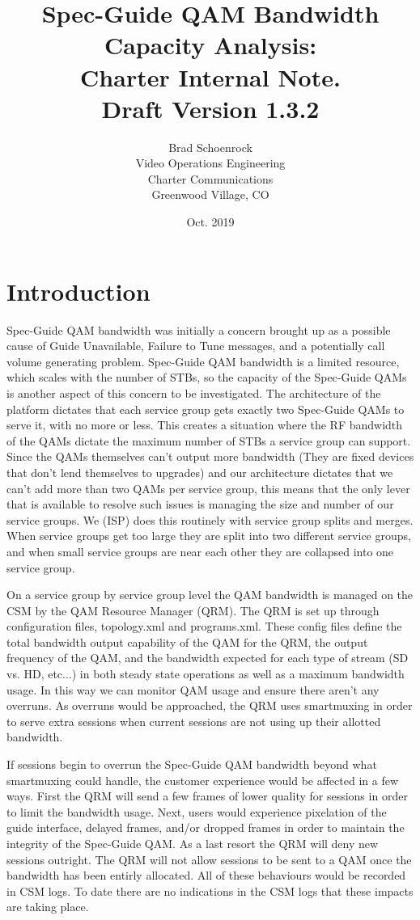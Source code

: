 \documentclass{article}
\author{Brad Schoenrock\\Video Operations Engineering\\Charter Communications\\Greenwood Village, CO}
\title{Spec-Guide QAM Bandwidth Capacity Analysis:\\Charter Internal Note.\\Draft Version 1.3.2}
\date{Oct. 2019}
\begin{document}
\maketitle
\newpage

\tableofcontents
\newpage

\section{Introduction}
\label{SECTION-Introduction}

Spec-Guide QAM bandwidth was initially a concern brought up as a possible cause of Guide Unavailable, Failure to Tune messages, and a potentially call volume generating problem. Spec-Guide QAM bandwidth is a limited resource, which scales with the number of STBs, so the capacity of the Spec-Guide QAMs is another aspect of this concern to be investigated. The architecture of the platform dictates that each service group gets exactly two Spec-Guide QAMs to serve it, with no more or less. This creates a situation where the RF bandwidth of the QAMs dictate the maximum number of STBs a service group can support. Since the QAMs themselves can't output more bandwidth (They are fixed devices that don't lend themselves to upgrades) and our architecture dictates that we can't add more than two QAMs per service group, this means that the only lever that is available to resolve such issues is managing the size and number of our service groups. We (ISP) does this routinely with service group splits and merges. When service groups get too large they are split into two different service groups, and when small service groups are near each other they are collapsed into one service group. 

On a service group by service group level the QAM bandwidth is managed on the CSM by the QAM Resource Manager (QRM). The QRM is set up through configuration files, topology.xml and programs.xml. These config files define the total bandwidth output capability of the QAM for the QRM, the output frequency of the QAM, and the bandwidth expected for each type of stream (SD vs. HD, etc...) in both steady state operations as well as a maximum bandwidth usage. In this way we can monitor QAM usage and ensure there aren't any overruns. As overruns would be approached, the QRM uses smartmuxing in order to serve extra sessions when current sessions are not using up their allotted bandwidth. 

If sessions begin to overrun the Spec-Guide QAM bandwidth beyond what smartmuxing could handle, the customer experience would be affected in a few ways. First the QRM will send a few frames of lower quality for sessions in order to limit the bandwidth usage. Next, users would experience pixelation of the guide interface, delayed frames, and/or dropped frames in order to maintain the integrity of the Spec-Guide QAM. As a last resort the QRM will deny new sessions outright. The QRM will not allow sessions to be sent to a QAM once the bandwidth has been entirly allocated. All of these behaviours would be recorded in CSM logs. To date there are no indications in the CSM logs that these impacts are taking place. 
\end{document}
